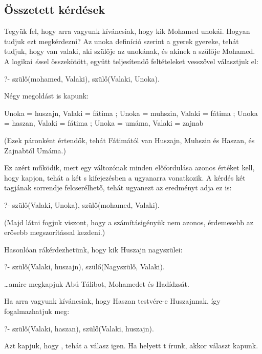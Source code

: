 \subsection*{Összetett kérdések}

Tegyük fel, hogy arra vagyunk kíváncsiak, hogy kik
Mohamed unokái. Hogyan tudjuk ezt megkérdezni? Az
unoka definíció szerint a gyerek gyereke, tehát
tudjuk, hogy van valaki, aki szülője az unokának, és
akinek a szülője Mohamed. A logikai \emph{és}\/sel
összekötött, együtt teljesítendő feltételeket
vesszővel választjuk el:
\begin{query}
?- szülő(mohamed, Valaki), szülő(Valaki, Unoka).
\end{query}
Négy megoldást is kapunk:
\begin{query}
Unoka = huszajn,
Valaki = fátima ;
Unoka = muhszin,
Valaki = fátima ;
Unoka = haszan,
Valaki = fátima ;
Unoka = umáma,
Valaki = zajnab
\end{query}
(Ezek páronként értendők, tehát Fátimától van
Huszajn, Muhszin és Haszan, és Zajnabtól Umáma.)

Ez azért működik, mert egy változónak minden
előfordulása azonos értéket kell, hogy kapjon,
tehát a két s kifejezésben a 
ugyanarra vonatkozik.
A kérdés két tagjának sorrendje felcserélhető, tehát
ugyanezt az eredményt adja ez is:
\begin{query}
?- szülő(Valaki, Unoka), szülő(mohamed, Valaki).
\end{query}
(Majd látni fogjuk viszont, hogy a számításigényük
nem azonos, érdemesebb az erősebb megszorítással
kezdeni.)

Hasonlóan rákérdezhetünk, hogy kik Huszajn
nagyszülei:
\begin{query}
?- szülő(Valaki, huszajn), szülő(Nagyszülő, Valaki).
\end{query}
\dots amire megkapjuk Abú Tálibot, Mohamedet és
Hadídzsát.

Ha arra vagyunk kíváncsiak, hogy Haszan testvére-e
Huszajnnak, így fogalmazhatjuk meg:
\begin{query}
?- szülő(Valaki, haszan), szülő(Valaki, huszajn).
\end{query}
Azt kapjuk, hogy , tehát a válasz
igen. Ha  helyett t írunk,
akkor  választ kapunk.

